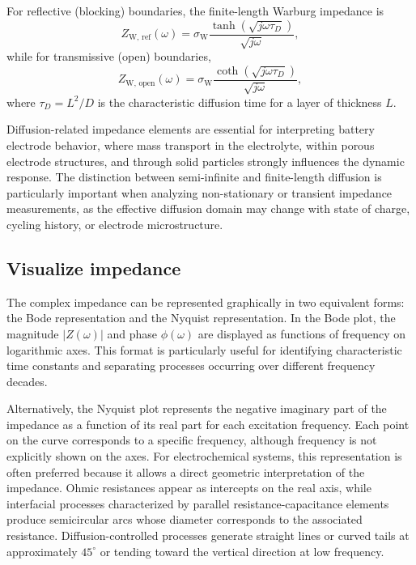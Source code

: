 For reflective (blocking) boundaries, the finite-length Warburg impedance is
\begin{equation}
    Z_{\mathrm{W,\,ref}}(\omega) = \sigma_{\mathrm{W}} \frac{\tanh\!\left(\sqrt{j\omega\tau_D}\right)}{\sqrt{j\omega}},
\end{equation}
while for transmissive (open) boundaries,
\begin{equation}
    Z_{\mathrm{W,\,open}}(\omega) = \sigma_{\mathrm{W}} \frac{\coth\!\left(\sqrt{j\omega\tau_D}\right)}{\sqrt{j\omega}},
\end{equation}
where $\tau_D = L^2/D$ is the characteristic diffusion time for a layer of thickness $L$.

Diffusion-related impedance elements are essential for interpreting battery electrode behavior, where mass transport in the electrolyte, within porous electrode structures, and through solid particles strongly influences the dynamic response. 
The distinction between semi-infinite and finite-length diffusion is particularly important when analyzing non-stationary or transient impedance measurements, as the effective diffusion domain may change with state of charge, cycling history, or electrode microstructure.

\subsection{Visualize impedance}

The complex impedance can be represented graphically in two equivalent forms: the Bode representation and the Nyquist representation.
In the Bode plot, the magnitude $|Z(\omega)|$ and phase $\phi(\omega)$ are displayed as functions of frequency on logarithmic axes. This format is particularly useful for identifying characteristic time constants and separating processes occurring over different frequency decades.

Alternatively, the Nyquist plot represents the negative imaginary part of the impedance as a function of its real part for each excitation frequency. Each point on the curve corresponds to a specific frequency, although frequency is not explicitly shown on the axes. For electrochemical systems, this representation is often preferred because it allows a direct geometric interpretation of the impedance. Ohmic resistances appear as intercepts on the real axis, while interfacial processes characterized by parallel resistance-capacitance elements produce semicircular arcs whose diameter corresponds to the associated resistance. Diffusion-controlled processes generate straight lines or curved tails at approximately $45^\circ$ or tending toward the vertical direction at low frequency.

